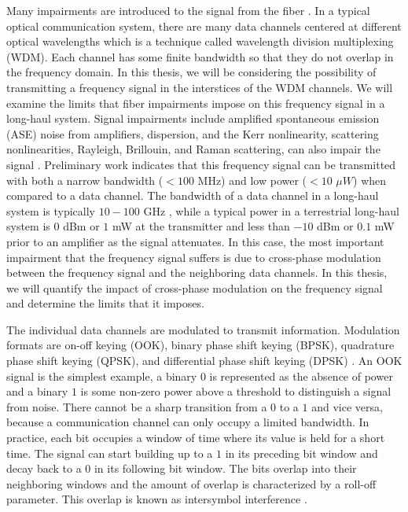 Many impairments are introduced to the signal from the fiber \cite{agrawal2012fiber}. In a typical optical communication system, there are many data channels centered at different optical wavelengths which is a technique called wavelength division multiplexing (WDM).  Each channel has some finite bandwidth so that they do not overlap in the frequency domain.  In this thesis, we will be considering the possibility of transmitting a frequency signal in the interstices of the WDM channels.  We will examine the limits that fiber impairments impose on this frequency signal in a long-haul system.  Signal impairments include amplified spontaneous emission (ASE) noise from amplifiers, dispersion, and the Kerr nonlinearity, scattering nonlinearities, Rayleigh, Brillouin, and Raman scattering, can also impair the signal \cite{agrawal2012fiber}\cite{Agrawal2013}.  Preliminary work indicates that this frequency signal can be transmitted with both a narrow bandwidth ($< 100$ MHz) and low power ($<10$ $\mu W$) when compared to a data channel.  The bandwidth of a data channel in a long-haul system is typically $10-100$ GHz \cite{ITU-T2012}, while a typical power in a terrestrial long-haul system is $0$ dBm or $1$ mW at the transmitter and less than $-10$ dBm or $0.1$ mW prior to an amplifier as the signal attenuates.  In this case, the most important impairment that the frequency signal suffers is due to cross-phase modulation between the frequency signal and the neighboring data channels.  In this thesis, we will quantify the impact of cross-phase modulation on the frequency signal and determine the limits that it imposes.


The individual data channels are modulated to transmit information.  Modulation formats are on-off keying (OOK), binary phase shift keying (BPSK), quadrature phase shift keying (QPSK), and differential phase shift keying (DPSK) \cite{agrawal2012fiber}.  An OOK signal is the simplest example, a binary $0$ is represented as the absence of power and a binary $1$ is some non-zero power above a threshold to distinguish a signal from noise.  There cannot be a sharp transition from a $0$ to a $1$ and vice versa, because a communication channel can only occupy a limited bandwidth.  In practice, each bit occupies a window of time where its value is held for a short time.  The signal can start building up to a $1$ in its preceding bit window and decay back to a $0$ in its following bit window.  The bits overlap into their neighboring windows and the amount of overlap is characterized by a roll-off parameter.  This overlap is known as intersymbol interference \cite{proakis2001digital}.

